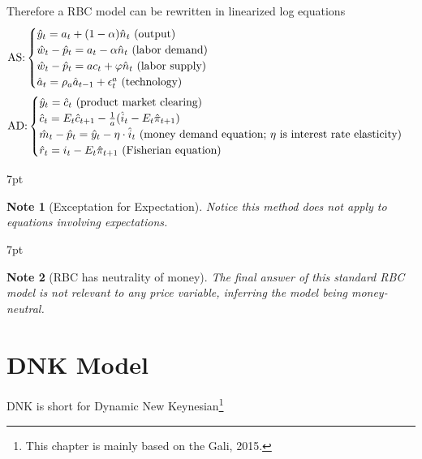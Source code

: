 \documentclass{article}
\newenvironment{blueblock}{
\def\FrameCommand{
  \hspace{1pt}
    {\color{DarkBlue}
    \vrule width 2pt}
    {\color{blueshade}
    \vrule width 4pt}
  \colorbox{blueshade}
}
\MakeFramed{
  \advance
  \hsize-
  \width
  \FrameRestore}
\noindent\hspace{-4.55pt}%
\begin{adjustwidth}{}{7pt}
\vspace{2pt}\vspace{2pt}
}
{\vspace{2pt}\end{adjustwidth}\endMakeFramed}
\newtheorem{note}{Note}
\begin{document}
{\color{red} Therefore a RBC model can be rewritten in linearized log equations
\begin{align}
\color{red}&\text{AS:} \begin{cases}
\hat y_{t}=a_{t}+(1-\alpha)\hat n_{t} \text{ (output)}\\
\hat w_{t}-\hat p_{t}=a_{t}-\alpha \hat n_{t} \text{ (labor demand)}\\
\hat w_{t}-\hat p_{t}=a c_{t}+\varphi \hat n_{t} \text{ (labor supply)}\\
\hat a_{t}=\rho_a \hat a_{t-1}+\epsilon_t^a \text{ (technology)}
\end{cases} 
\\&
\text{AD:} \begin{cases}
\hat y_{t}=\hat c_{t} \text{ (product market clearing)}\\
\hat c_{t}=E_{t}\hat c_{t+1}-\frac{1}{a}(\hat i_{t}-E_{t}\hat \pi_{t+1}) \\
\hat m_{t}-\hat p_{t}=\hat y_{t}-\eta \cdot \hat i_{t} \text{ (money demand equation; $\eta$ is interest rate elasticity)}\\
\hat r_{t}=i_{t}-E_{t} \hat \pi_{t+1} \text{ (Fisherian equation)}
\end{cases}
\end{align}
}

\begin{blueblock}
\begin{note}[Exceptation for Expectation]
Notice this method does not apply to equations involving expectations.
\end{note}
\end{blueblock}

\begin{blueblock}
\begin{note}[RBC has neutrality of money]
The final answer of this standard RBC model is not relevant to any price variable, inferring the model being money-neutral.
\end{note}
\end{blueblock}









\newpage
\section{DNK Model}\label{dnk-model}

DNK is short for Dynamic New Keynesian\footnote{This chapter is mainly based on the Gali, 2015.}
\end{document}
